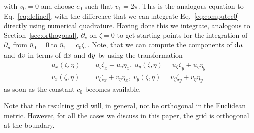  with $v_0 = 0$ and choose $c_0$ such that $v_1=2\pi$. This is the analogous
 equation to Eq.~\eqref{eq:definef}, with the difference that we can integrate
 Eq.~\eqref{eq:computec0} directly using numerical quadrature. 
Having done this we integrate, analogous to Section~\ref{sec:orthogonal}, 
$\partial_v $ on $\zeta=0$ to get starting points for the integration of $\partial_u$ 
from $\bar u_0 = 0$ to $\bar u_1= c_0 \zeta_1$.
Note, that we can compute the components of $\mathrm{d} u$ and $\mathrm{d} v$ in terms of $\mathrm{d} x$ and $\mathrm{d} y$ by using the transformation
\begin{subequations}
\begin{align}
  u_x(\zeta, \eta)  &= u_\zeta \zeta_x + u_\eta\eta_x,\ u_y(\zeta, \eta) = u_\zeta \zeta_y + u_\eta\eta_y\\
  v_x(\zeta, \eta)  &= v_\zeta \zeta_x + v_\eta\eta_x,\ v_y(\zeta, \eta) = v_\zeta \zeta_y + v_\eta\eta_y
\end{align} 
  \label{eq:chain_rule}
\end{subequations}
as soon as the constant $c_0$ becomes available. 

Note that the resulting grid will, in general, not be orthogonal 
in the Euclidean metric. However, for all the cases we discuss
in this paper, the grid is orthogonal at the boundary. 


